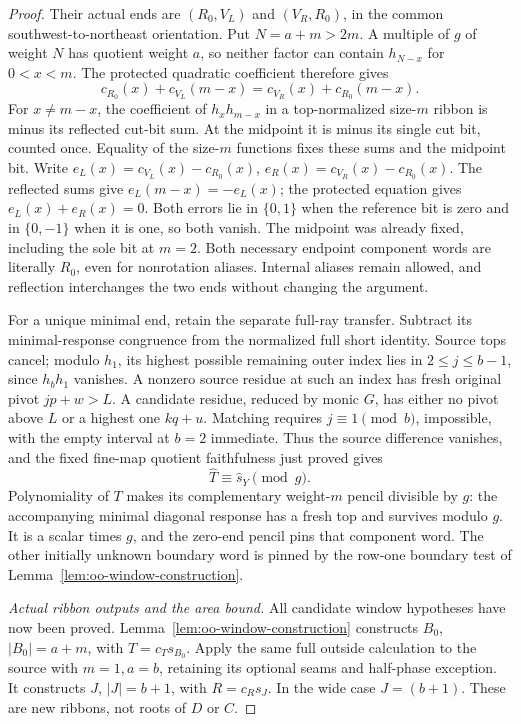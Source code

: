 \documentclass[11pt,a4paper]{amsart}
\numberwithin{equation}{section}
\theoremstyle{plain}
\theoremstyle{definition}
\begin{document}
\begin{proof}
Their actual ends are \((R_0,V_L)\) and \((V_R,R_0)\), in the common southwest-to-northeast orientation.  Put \(N=a+m>2m\).  A multiple of \(g\) of weight \(N\) has quotient weight \(a\), so neither factor can contain \(h_{N-x}\) for \(0<x<m\).  The protected quadratic coefficient therefore gives
\[
 c_{R_0}(x)+c_{V_L}(m-x)
 =c_{V_R}(x)+c_{R_0}(m-x).
\]
For \(x\ne m-x\), the coefficient of \(h_xh_{m-x}\) in a top-normalized size-\(m\) ribbon is minus its reflected cut-bit sum.  At the midpoint it is minus its single cut bit, counted once.  Equality of the size-\(m\) functions fixes these sums and the midpoint bit.  Write \(e_L(x)=c_{V_L}(x)-c_{R_0}(x)\), \(e_R(x)=c_{V_R}(x)-c_{R_0}(x)\).  The reflected sums give \(e_L(m-x)=-e_L(x)\); the protected equation gives \(e_L(x)+e_R(x)=0\).  Both errors lie in \(\{0,1\}\) when the reference bit is zero and in \(\{0,-1\}\) when it is one, so both vanish.  The midpoint was already fixed, including the sole bit at \(m=2\).  Both necessary endpoint component words are literally \(R_0\), even for nonrotation aliases.  Internal aliases remain allowed, and reflection interchanges the two ends without changing the argument.

For a unique minimal end, retain the separate full-ray transfer.  Subtract its minimal-response congruence from the normalized full short identity.  Source tops cancel; modulo \(h_1\), its highest possible remaining outer index lies in \(2\le j\le b-1\), since \(h_bh_1\) vanishes.  A nonzero source residue at such an index has fresh original pivot \(jp+w>L\).  A candidate residue, reduced by monic \(G\), has either no pivot above \(L\) or a highest one \(kq+u\).  Matching requires \(j\equiv1\pmod b\), impossible, with the empty interval at \(b=2\) immediate.  Thus the source difference vanishes, and the fixed fine-map quotient faithfulness just proved gives
\[
 \widehat T\equiv\widehat s_Y\pmod g.
\]
Polynomiality of \(T\) makes its complementary weight-\(m\) pencil divisible by \(g\): the accompanying minimal diagonal response has a fresh top and survives modulo \(g\).  It is a scalar times \(g\), and the zero-end pencil pins that component word.  The other initially unknown boundary word is pinned by the row-one boundary test of Lemma~\ref{lem:oo-window-construction}.

\emph{Actual ribbon outputs and the area bound.}
All candidate window hypotheses have now been proved.  Lemma~\ref{lem:oo-window-construction} constructs \(B_0\), \(|B_0|=a+m\), with \(T=c_Ts_{B_0}\).  Apply the same full outside calculation to the source with \(m=1,a=b\), retaining its optional seams and half-phase exception.  It constructs \(J\), \(|J|=b+1\), with \(R=c_Rs_J\).  In the wide case \(J=(b+1)\).  These are new ribbons, not roots of \(D\) or \(C\).


\end{proof}
\end{document}
